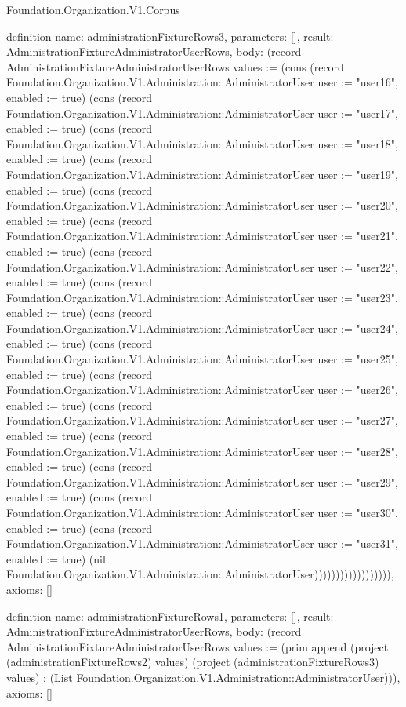 \begin{lexlean}{Foundation.Organization.V1.Corpus}
\begin{semanticmodule}
definition{
  name: administrationFixtureRows3,
  parameters: [],
  result: AdministrationFixtureAdministratorUserRows,
  body: (record AdministrationFixtureAdministratorUserRows {values := (cons (record Foundation.Organization.V1.Administration::AdministratorUser {user := "user16", enabled := true}) (cons (record Foundation.Organization.V1.Administration::AdministratorUser {user := "user17", enabled := true}) (cons (record Foundation.Organization.V1.Administration::AdministratorUser {user := "user18", enabled := true}) (cons (record Foundation.Organization.V1.Administration::AdministratorUser {user := "user19", enabled := true}) (cons (record Foundation.Organization.V1.Administration::AdministratorUser {user := "user20", enabled := true}) (cons (record Foundation.Organization.V1.Administration::AdministratorUser {user := "user21", enabled := true}) (cons (record Foundation.Organization.V1.Administration::AdministratorUser {user := "user22", enabled := true}) (cons (record Foundation.Organization.V1.Administration::AdministratorUser {user := "user23", enabled := true}) (cons (record Foundation.Organization.V1.Administration::AdministratorUser {user := "user24", enabled := true}) (cons (record Foundation.Organization.V1.Administration::AdministratorUser {user := "user25", enabled := true}) (cons (record Foundation.Organization.V1.Administration::AdministratorUser {user := "user26", enabled := true}) (cons (record Foundation.Organization.V1.Administration::AdministratorUser {user := "user27", enabled := true}) (cons (record Foundation.Organization.V1.Administration::AdministratorUser {user := "user28", enabled := true}) (cons (record Foundation.Organization.V1.Administration::AdministratorUser {user := "user29", enabled := true}) (cons (record Foundation.Organization.V1.Administration::AdministratorUser {user := "user30", enabled := true}) (cons (record Foundation.Organization.V1.Administration::AdministratorUser {user := "user31", enabled := true}) (nil Foundation.Organization.V1.Administration::AdministratorUser)))))))))))))))))}),
  axioms: []
}

definition{
  name: administrationFixtureRows1,
  parameters: [],
  result: AdministrationFixtureAdministratorUserRows,
  body: (record AdministrationFixtureAdministratorUserRows {values := (prim append (project (administrationFixtureRows2) values) (project (administrationFixtureRows3) values) : (List Foundation.Organization.V1.Administration::AdministratorUser))}),
  axioms: []
}


\end{semanticmodule}
\end{lexlean}
